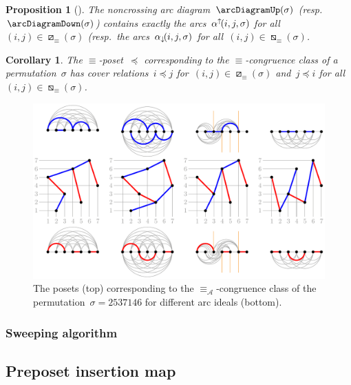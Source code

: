 \documentclass{amsart}
\newtheorem{corollary}[theorem]{Corollary}
\newtheorem{proposition}[theorem]{Proposition}
\theoremstyle{definition}
\newcommand{\vincent}[1]{\todo[color=blue!30]{#1 \\ \hfill --- V.}}
\newcommand{\arcs}{{\mathcal{A}}} %
\newcommand{\arcDown}{\smash{\alpha_{\downarrow\!}}} %
\newcommand{\arcUp}{\smash{\alpha^{\uparrow\!}}} %
\begin{document}
\begin{proposition}[{\cite[Sect.~2.4]{Pilaud-arcDiagramAlgebra}}]
\label{prop:insertionMap}
The noncrossing arc diagram~$\arcDiagramUp(\sigma)$ (resp.~$\arcDiagramDown(\sigma)$) contains exactly the arcs~$\arcUp(i,j,\sigma)$ for all~$(i,j) \in \boxslash_\equiv(\sigma)$ (resp.~the arcs~$\arcDown(i,j,\sigma)$ for all~$(i,j) \in \boxbslash_\equiv(\sigma)$.
\end{proposition}

\begin{corollary}
\label{coro:insertionMap}
The $\equiv$-poset~$\preccurlyeq$ corresponding to the $\equiv$-congruence class of a permutation~$\sigma$ has cover relations~$i \preccurlyeq j$ for~$(i,j) \in \boxslash_\equiv(\sigma)$ and~$j \preccurlyeq i$ for all~$(i,j) \in \boxbslash_\equiv(\sigma)$.
\end{corollary}

\begin{figure}
	\capstart
	\centerline{\includegraphics[scale=.85]{arcDiagramsQuotients}}
	\caption{The posets (top) corresponding to the $\equiv_\arcs$-congruence class of the permutation~$\sigma = 2537146$ for different arc ideals (bottom).}
	\label{fig:arcDiagramsQuotients}
\end{figure}

\subsubsection{Sweeping algorithm}
\vincent{todo}


\subsection{Preposet insertion map}
\label{subsec:insertionMap}
\end{document}
